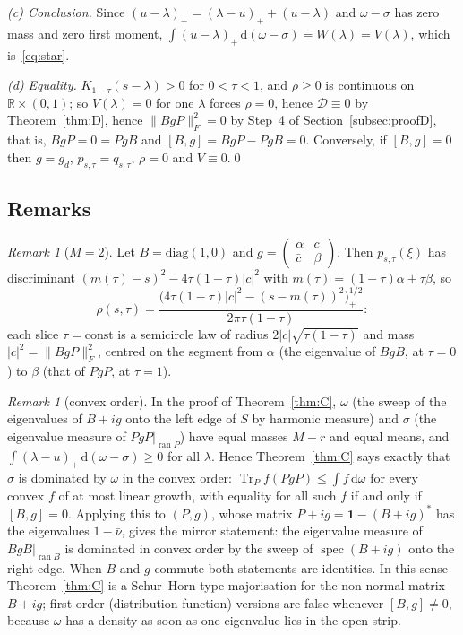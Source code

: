 \documentclass[11pt]{amsart}
\theoremstyle{definition}
\theoremstyle{remark}
\newtheorem{remark}[theorem]{Remark}
\numberwithin{equation}{section}
\newcommand{\R}{\mathbb{R}}
\newcommand{\Tr}{\operatorname{Tr}}
\newcommand{\spec}{\operatorname{spec}}
\newcommand{\one}{\mathbf{1}}
\newcommand{\cD}{\mathcal{D}}
\newcommand{\dd}{\,\mathrm{d}}
\begin{document}
\emph{(c) Conclusion.} Since $(u-\lambda)_+=(\lambda-u)_++(u-\lambda)$ and $\omega-\sigma$ has zero mass and zero first moment,
$\int(u-\lambda)_+\dd(\omega-\sigma)=W(\lambda)=V(\lambda)$, which is~\eqref{eq:star}.

\emph{(d) Equality.} $K_{1-\tau}(s-\lambda)>0$ for $0<\tau<1$, and $\rho\ge0$ is continuous on $\R\times(0,1)$; so $V(\lambda)=0$ for
one $\lambda$ forces $\rho=0$, hence $\cD\equiv0$ by Theorem~\ref{thm:D}, hence $\|BgP\|_F^2=0$ by Step~4 of
Section~\ref{subsec:proofD}, that is, $BgP=0=PgB$ and $[B,g]=BgP-PgB=0$. Conversely, if $[B,g]=0$ then $g=g_d$,
$p_{s,\tau}=q_{s,\tau}$, $\rho=0$ and $V\equiv0$.\qed

\subsection{Remarks}

\begin{remark}[$M=2$]\label{rem:M2}
Let $B=\mathrm{diag}(1,0)$ and $g=\begin{pmatrix}\alpha&c\\\bar c&\beta\end{pmatrix}$. Then $p_{s,\tau}(\xi)$ has discriminant
$(m(\tau)-s)^2-4\tau(1-\tau)|c|^2$ with $m(\tau)=(1-\tau)\alpha+\tau\beta$, so
\[
\rho(s,\tau)=\frac{\bigl(4\tau(1-\tau)|c|^2-(s-m(\tau))^2\bigr)_+^{1/2}}{2\pi\tau(1-\tau)} :
\]
each slice $\tau=\mathrm{const}$ is a semicircle law of radius $2|c|\sqrt{\tau(1-\tau)}$ and mass $|c|^2=\|BgP\|_F^2$,
centred on the segment from $\alpha$ (the eigenvalue of $BgB$, at $\tau=0$) to $\beta$ (that of $PgP$, at $\tau=1$).
\end{remark}

\begin{remark}[convex order]\label{rem:convex}
In the proof of Theorem~\ref{thm:C}, $\omega$ (the sweep of the eigenvalues of $B+ig$ onto the left edge of $\bar S$ by
harmonic measure) and $\sigma$ (the eigenvalue measure of $PgP|_{\operatorname{ran}P}$) have equal masses $M-r$ and equal
means, and $\int(\lambda-u)_+\dd(\omega-\sigma)\ge0$ for all $\lambda$. Hence Theorem~\ref{thm:C} says exactly that
$\sigma$ is dominated by $\omega$ in the convex order: $\Tr_Pf(PgP)\le\int f\dd\omega$ for every convex $f$ of at most
linear growth, with equality for all such $f$ if and only if $[B,g]=0$. Applying this to $(P,g)$, whose matrix
$P+ig=\one-(B+ig)^*$ has the eigenvalues $1-\bar\nu$, gives the mirror statement: the eigenvalue measure of
$BgB|_{\operatorname{ran}B}$ is dominated in convex order by the sweep of $\spec(B+ig)$ onto the right edge. When $B$
and $g$ commute both statements are identities. In this sense Theorem~\ref{thm:C} is a Schur--Horn type majorisation
for the non-normal matrix $B+ig$; first-order (distribution-function) versions are false whenever $[B,g]\ne0$,
because $\omega$ has a density as soon as one eigenvalue lies in the open strip.
\end{remark}
\end{document}

